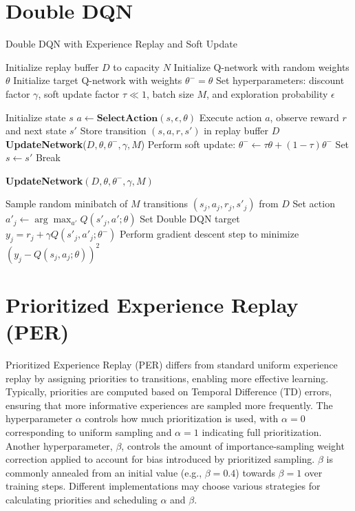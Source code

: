 \documentclass{article}
\begin{document}
\section{Double DQN}

\begin{algorithm}[H]
\caption{Double DQN with Experience Replay and Soft Update}
\begin{algorithmic}[1]
\STATE Initialize replay buffer $D$ to capacity $N$
\STATE Initialize Q-network with random weights $\theta$
\STATE Initialize target Q-network with weights $\theta^{-} = \theta$
\STATE Set hyperparameters: discount factor $\gamma$, soft update factor $\tau \ll 1$, batch size $M$, and exploration probability $\epsilon$

    \STATE Initialize state $s$
        \STATE $a \leftarrow \textbf{SelectAction}(s, \epsilon, \theta)$
        \STATE Execute action $a$, observe reward $r$ and next state $s'$ 
        \STATE Store transition $(s,a,r,s')$ in replay buffer $D$
        \STATE \textbf{UpdateNetwork}($D, \theta, \theta^{-}, \gamma, M$)
        \STATE Perform soft update: $\theta^{-} \leftarrow \tau \theta + (1 - \tau) \theta^{-}$
        \STATE Set $s \leftarrow s'$
            \STATE Break
        \ENDIF
    \ENDFOR
\ENDFOR

\vspace{0.5em}
\STATE \textbf{UpdateNetwork}$(D, \theta, \theta^{-}, \gamma, M)$
\begin{ALC@g}
    \STATE Sample random minibatch of $M$ transitions $(s_j,a_j,r_j,s'_j)$ from $D$
    \STATE Set action $a'_j \leftarrow \arg\max_{a'}Q(s'_j, a'; \theta)$
    \STATE Set Double DQN target $y_j = r_j + \gamma Q(s'_j, a'_j; \theta^{-})$
    \STATE Perform gradient descent step to minimize $(y_j - Q(s_j, a_j; \theta))^2$
\end{ALC@g}

\end{algorithmic}
\end{algorithm}

\section{Prioritized Experience Replay (PER)}

Prioritized Experience Replay (PER) differs from standard uniform experience replay by assigning priorities to transitions, enabling more effective learning. Typically, priorities are computed based on Temporal Difference (TD) errors, ensuring that more informative experiences are sampled more frequently. The hyperparameter $\alpha$ controls how much prioritization is used, with $\alpha = 0$ corresponding to uniform sampling and $\alpha = 1$ indicating full prioritization. Another hyperparameter, $\beta$, controls the amount of importance-sampling weight correction applied to account for bias introduced by prioritized sampling. $\beta$ is commonly annealed from an initial value (e.g., $\beta = 0.4$) towards $\beta = 1$ over training steps. Different implementations may choose various strategies for calculating priorities and scheduling $\alpha$ and $\beta$.
\end{document}
